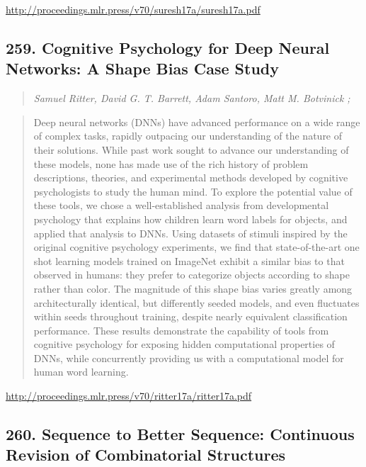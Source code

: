 \documentclass{article}
\begin{document}
\href{http://proceedings.mlr.press/v70/suresh17a/suresh17a.pdf}{http://proceedings.mlr.press/v70/suresh17a/suresh17a.pdf}

\subsection{259. Cognitive Psychology for Deep Neural Networks: A Shape Bias Case Study}

\begin{quote}
\footnotesize{\textit{Samuel Ritter, David G. T. Barrett, Adam Santoro, Matt M. Botvinick ;}}

\end{quote}

\begin{quote}
    Deep neural networks (DNNs) have advanced performance on a wide range of complex tasks, rapidly outpacing our understanding of the nature of their solutions. While past work sought to advance our understanding of these models, none has made use of the rich history of problem descriptions, theories, and experimental methods developed by cognitive psychologists to study the human mind. To explore the potential value of these tools, we chose a well-established analysis from developmental psychology that explains how children learn word labels for objects, and applied that analysis to DNNs. Using datasets of stimuli inspired by the original cognitive psychology experiments, we find that state-of-the-art one shot learning models trained on ImageNet exhibit a similar bias to that observed in humans: they prefer to categorize objects according to shape rather than color. The magnitude of this shape bias varies greatly among architecturally identical, but differently seeded models, and even fluctuates within seeds throughout training, despite nearly equivalent classification performance. These results demonstrate the capability of tools from cognitive psychology for exposing hidden computational properties of DNNs, while concurrently providing us with a computational model for human word learning.  
\end{quote}

\href{http://proceedings.mlr.press/v70/ritter17a/ritter17a.pdf}{http://proceedings.mlr.press/v70/ritter17a/ritter17a.pdf}

\subsection{260. Sequence to Better Sequence: Continuous Revision of Combinatorial Structures}
\end{document}
